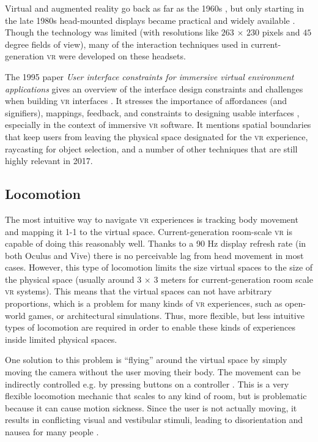 \documentclass[nobib]{tufte-book} %
\begin{document}
Virtual and augmented reality go back as far as the 1960s \cite{sutherland1968head}, but only starting in the late 1980s head-mounted displays became practical and widely available \cite{billinghurst2015survey}. Though the technology was limited (with resolutions like $263$ $\times$ $230$ pixels and $45$ degree fields of view), many of the interaction techniques used in current-generation \textsc{vr} were developed on these headsets.

The 1995 paper \emph{User interface constraints for immersive virtual environment applications} gives an overview of the interface design constraints and challenges when building \textsc{vr} interfaces \cite{bowman1995user}. It stresses the importance of affordances (and signifiers), mappings, feedback, and constraints to designing usable interfaces \cite{norman2013design}, especially in the context of immersive \textsc{vr} software. It mentions spatial boundaries that keep users from leaving the physical space designated for the \textsc{vr} experience, raycasting for object selection, and a number of other techniques that are still highly relevant in 2017.

\subsection{Locomotion}
The most intuitive way to navigate \textsc{vr} experiences is tracking body movement and mapping it 1-1 to the virtual space. Current-generation room-scale \textsc{vr} is capable of doing this reasonably well. Thanks to a 90 Hz display refresh rate (in both Oculus and Vive) there is no perceivable lag from head movement in most cases. However, this type of locomotion limits the size virtual spaces to the size of the physical space (usually around $3$ $\times$ $3$ meters for current-generation room scale \textsc{vr} systems). This means that the virtual spaces can not have arbitrary proportions, which is a problem for many kinds of \textsc{vr} experiences, such as open-world games, or architectural simulations. Thus, more flexible, but less intuitive types of locomotion are required in order to enable these kinds of experiences inside limited physical spaces.

One solution to this problem is ``flying'' around the virtual space by simply moving the camera without the user moving their body. The movement can be indirectly controlled e.g. by pressing buttons on a controller \cite{bowman1996evaluation} \cite{bowman1995user}. This is a very flexible locomotion mechanic that scales to any kind of room, but is problematic because it can cause motion sickness. Since the user is not actually moving, it results in conflicting visual and vestibular stimuli, leading to disorientation and nausea for many people \cite{akiduki2003visual}.
\end{document}
